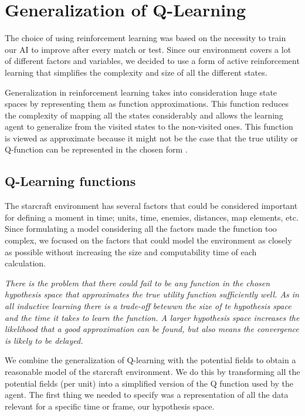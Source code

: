 

\section{Generalization of Q-Learning}	\label{qlearning}

The choice of using reinforcement learning was based on the necessity to train our AI to improve after every match or test. Since our environment covers a lot of different factors and variables, we decided to use a form of active reinforcement learning that simplifies the complexity and size of all the different states. 

Generalization in reinforcement learning takes into consideration huge state spaces by representing them as function approximations. This function reduces the complexity of mapping all the states considerably and allows the learning agent to generalize from the visited states to the non-visited ones. This function is viewed as approximate because it might not be the case that the true utility or Q-function can be represented in the chosen form \cite[p777]{rl}. 

\subsection{Q-Learning functions}

The starcraft environment has several factors that could be considered important for defining a moment in time; units, time, enemies, distances, map elements, etc. Since formulating a model considering all the factors made the function too complex, we focused on the factors that could model the environment as closely as possible without increasing the size and computability time of each calculation. 

\textit{There is the problem that there could fail to be any function in the chosen hypothesis space that approximates the true utility function sufficiently well. As in all inductive learning there is a trade-off betewwn the size of te hypothesis space and the time it takes to learn the function. A larger hypothesis space increases the likelihood that a good approximation can be found, but also means the convergence is likely to be delayed.}\cite[p778]{rl}

We combine the generalization of Q-learning with the potential fields to obtain a reasonable model of the starcraft environment. We do this by transforming all the potential fields (per unit) into a simplified version of the Q function used by the agent. The first thing we needed to specify was a representation of all the data relevant for a specific time or frame, our hypothesis space. 

